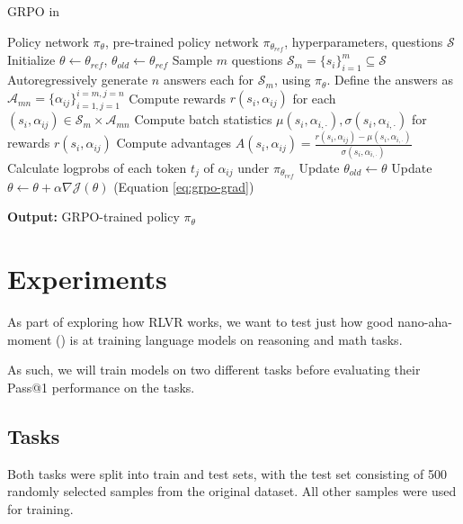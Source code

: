 \documentclass{article} %
\theoremstyle{definition}
\begin{document}
\begin{algorithm}
    \caption{GRPO in \cite{nano-aha-moment}}
    \begin{algorithmic}[1]
        \State Policy network $\pi_\theta$, pre-trained policy network $\pi_{\theta_{ref}}$, 
        hyperparameters, questions $\mathcal{S}$
        \State Initialize $\theta \leftarrow \theta_{ref}$, $\theta_{old} \leftarrow \theta_{ref}$
            \State Sample $m$ questions $\mathcal{S}_m = \{s_i\}_{i=1}^m \subseteq \mathcal{S}$
            \State Autoregressively generate $n$ answers each for $\mathcal{S}_m$, using $\pi_\theta$. Define the answers as $\mathcal{A}_{mn} = \{\alpha_{ij}\}_{i=1, j=1}^{i=m, j=n}$
            \State Compute rewards $r(s_i, \alpha_{ij})$ for each $(s_i, \alpha_{ij}) \in \mathcal{S}_m \times \mathcal{A}_{mn}$
            \State Compute batch statistics $\mu(s_i, \alpha_{i, \cdot}), \sigma(s_i, \alpha_{i, \cdot})$ for rewards $r(s_i, \alpha_{ij})$
            \State Compute advantages $A(s_i, \alpha_{ij}) = \frac{r(s_i, \alpha_{ij}) - \mu(s_i, \alpha_{i, \cdot})}{\sigma(s_i, \alpha_{i, \cdot})}$
            \State Calculate logprobs of each token $t_j$ of $\alpha_{ij}$ under $\pi_{\theta_{ref}}$
            \State Update $\theta_{old} \leftarrow \theta$
            \State Update $\theta \leftarrow \theta + \alpha \nabla \mathcal{J}(\theta)$ (Equation \ref{eq:grpo-grad})
        \EndWhile

        \hspace*{-40pt} \textbf{Output:} GRPO-trained policy $\pi_\theta$
    \end{algorithmic}

    \label{alg:grpo-nano-aha-moment}
\end{algorithm}


\section{Experiments}

As part of exploring how RLVR works, we want to test
just how good nano-aha-moment (\cite{nano-aha-moment})
is at training language models on reasoning and math tasks.

As such, we will train models on two different tasks before evaluating
their Pass@1 performance on the tasks.

\subsection{Tasks}
Both tasks were split into train and test sets, with
the test set consisting of 500 randomly selected samples from the original dataset. All other samples were used for training.
\end{document}
